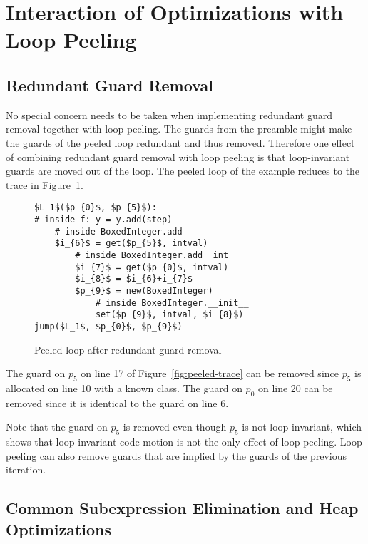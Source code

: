\documentclass[preprint]{sigplanconf}
\begin{document}
\section{Interaction of Optimizations with Loop Peeling}

\subsection{Redundant Guard Removal}

No special concern needs to be taken when implementing redundant
guard removal together with loop peeling. The guards from
the preamble might make the guards of the peeled loop
redundant and thus removed. Therefore one effect of combining redundant
guard removal with loop peeling is that loop-invariant guards are moved out of the
loop. The peeled loop of the example reduces to the trace in Figure~\ref{fig:guard-trace}.

\begin{figure}
\begin{lstlisting}[mathescape,numbers = right,basicstyle=\setstretch{1.05}\ttfamily\scriptsize]
$L_1$($p_{0}$, $p_{5}$):
# inside f: y = y.add(step)
    # inside BoxedInteger.add
    $i_{6}$ = get($p_{5}$, intval)
        # inside BoxedInteger.add__int
        $i_{7}$ = get($p_{0}$, intval)
        $i_{8}$ = $i_{6}+i_{7}$
        $p_{9}$ = new(BoxedInteger)
            # inside BoxedInteger.__init__
            set($p_{9}$, intval, $i_{8}$)
jump($L_1$, $p_{0}$, $p_{9}$)
\end{lstlisting}
\caption{Peeled loop after redundant guard removal}
\label{fig:guard-trace}
\end{figure}

The guard on $p_5$ on line 17 of Figure~\ref{fig:peeled-trace} can be
removed since $p_5$ is allocated on line 10 with a known class. The
guard on $p_0$ on line 20 can be removed since it is identical to the
guard on line 6.

Note that the guard on $p_5$ is removed even though $p_5$ is not loop
invariant, which shows that loop invariant code motion is not the only
effect of loop peeling. Loop peeling can also remove guards that are implied by
the guards of the previous iteration.



\subsection{Common Subexpression Elimination and Heap Optimizations}
\end{document}
